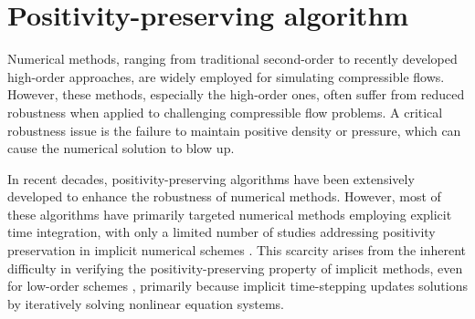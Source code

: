 
\section{Positivity-preserving algorithm}
\label{sec:PP}

Numerical methods, ranging from traditional second-order to recently developed high-order approaches, are widely employed for simulating compressible flows. However, these methods, especially the high-order ones, often suffer from reduced robustness when applied to challenging compressible flow problems. A critical robustness issue is the failure to maintain positive density or pressure, which can cause the numerical solution to blow up.



In recent decades, positivity-preserving algorithms have been extensively developed to enhance the robustness of numerical methods. However, most of these algorithms have primarily targeted numerical methods employing explicit time integration, with only a limited number of studies addressing positivity preservation in implicit numerical schemes \cite{qin2018implicit}. This scarcity arises from the inherent difficulty in verifying the positivity-preserving property of implicit methods, even for low-order schemes \cite{huang2024general}, primarily because implicit time-stepping updates solutions by iteratively solving nonlinear equation systems.



